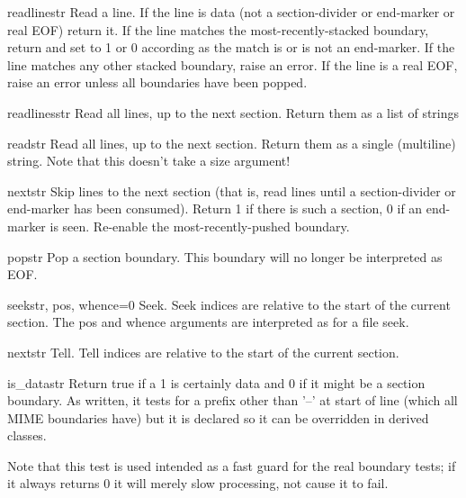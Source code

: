 \begin{methoddesc}{readline}{str}
Read a line.  If the line is data (not a section-divider or end-marker
or real EOF) return it.  If the line matches the most-recently-stacked
boundary, return  and set  to 1 or 0 according as
the match is or is not an end-marker.  If the line matches any other
stacked boundary, raise an error.  If the line is a real EOF, raise an
error unless all boundaries have been popped.
\end{methoddesc}

\begin{methoddesc}{readlines}{str}
Read all lines, up to the next section.  Return them as a list of strings
\end{methoddesc}

\begin{methoddesc}{read}{str}
Read all lines, up to the next section.  Return them as a single
(multiline) string.  Note that this doesn't take a size argument!
\end{methoddesc}

\begin{methoddesc}{next}{str}
Skip lines to the next section (that is, read lines until a
section-divider or end-marker has been consumed).  Return 1 if there
is such a section, 0 if an end-marker is seen.  Re-enable the
most-recently-pushed boundary.
\end{methoddesc}

\begin{methoddesc}{pop}{str}
Pop a section boundary.  This boundary will no longer be interpreted as EOF.
\end{methoddesc}

\begin{methoddesc}{seek}{str, pos, whence=0}
Seek.  Seek indices are relative to the start of the current section.
The pos and whence arguments are interpreted as for a file seek.
\end{methoddesc}

\begin{methoddesc}{next}{str}
Tell.  Tell indices are relative to the start of the current section.
\end{methoddesc}

\begin{methoddesc}{is_data}{str}
Return true if a 1 is certainly data and 0 if it might be a section
boundary.  As written, it tests for a prefix other than '--' at start of
line (which all MIME boundaries have) but it is declared so it can be
overridden in derived classes.

Note that this test is used intended as a fast guard for the real
boundary tests; if it always returns 0 it will merely slow processing,
not cause it to fail.
\end{methoddesc}

